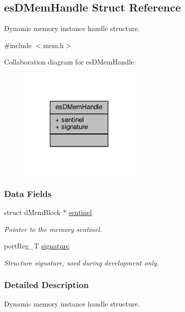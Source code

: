 \hypertarget{structesDMemHandle}{\subsection{es\-D\-Mem\-Handle Struct Reference}
\label{structesDMemHandle}
}


Dynamic memory instance handle structure.  




{\ttfamily \#include $<$mem.\-h$>$}



Collaboration diagram for es\-D\-Mem\-Handle\-:\nopagebreak
\begin{figure}[H]
\begin{center}
\leavevmode
\includegraphics[width=166pt]{structesDMemHandle__coll__graph}
\end{center}
\end{figure}
\subsubsection*{Data Fields}
\begin{DoxyCompactItemize}
\item 
struct d\-Mem\-Block $\ast$ \hyperlink{structesDMemHandle_a64c2d859ebf90e27873f20e1cbbc3bb8}{sentinel}
\begin{DoxyCompactList}\small\item\em Pointer to the memory sentinel. \end{DoxyCompactList}\item 
port\-Reg\-\_\-\-T \hyperlink{structesDMemHandle_a471b42b8a335144bbb79ab89c0c3d170}{signature}
\begin{DoxyCompactList}\small\item\em Structure signature, used during development only. \end{DoxyCompactList}\end{DoxyCompactItemize}


\subsubsection{Detailed Description}
Dynamic memory instance handle structure. 

